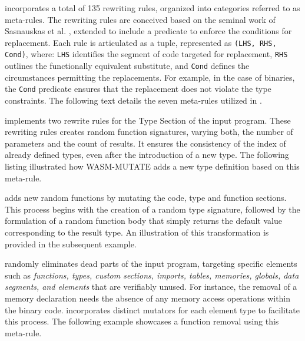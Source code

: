 





\tool incorporates a total of 135 rewriting rules, organized into categories referred to as meta-rules. 
The rewriting rules are conceived based on the seminal work of Sasnauskas et al. \cite{2017arXiv171104422S}, extended to include a predicate to enforce the conditions for replacement. 
Each rule is articulated as a tuple, represented as \texttt{(LHS, RHS, Cond)}, where: \texttt{LHS} identifies the segment of code targeted for replacement, \texttt{RHS} outlines the functionally equivalent substitute, and \texttt{Cond} defines the circumstances permitting the replacements.
For example, in the case of \Wasm binaries, the \texttt{Cond} predicate ensures that the replacement does not violate the type constraints. 
The following text details the seven meta-rules utilized in \tool.


\tool implements two rewrite rules for the Type Section of the input \Wasm program.
These rewriting rules creates random function signatures, varying both, the number of parameters and the count of results. 
It ensures the consistency of the index of already defined types, even after the introduction of a new type.
The following listing illustrated how WASM-MUTATE adds a new type definition based on this meta-rule. 



\tool adds new random functions by mutating the code, type and function sections. 
This process begins with the creation of a random type signature, followed by the formulation of a random function body that simply returns the default value corresponding to the result type. 
An illustration of this transformation is provided in the subsequent example.



 \tool randomly eliminates dead parts of the input \wasm program, targeting specific elements such as \emph{functions, types, custom sections, imports, tables, memories, globals, data segments, and elements} that are verifiably unused. 
For instance, the removal of a memory declaration needs the absence of any memory access operations within the binary code. 
\tool incorporates distinct mutators for each element type to facilitate this process.
The following example showcases a function removal using this meta-rule.




